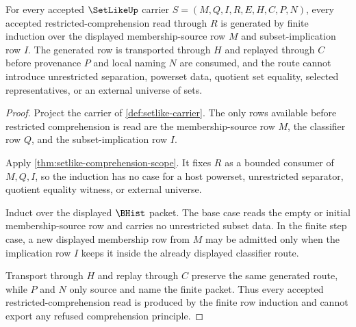 \begin{theorem}
\label{thm:setlike-bounded-comprehension-induction}
For every accepted $\SetLikeUp$ carrier $S=(M,Q,I,R,E,H,C,P,N)$, every accepted restricted-comprehension read through $R$ is generated by finite induction over the displayed membership-source row $M$ and subset-implication row $I$. The generated row is transported through $H$ and replayed through $C$ before provenance $P$ and local naming $N$ are consumed, and the route cannot introduce unrestricted separation, powerset data, quotient set equality, selected representatives, or an external universe of sets.
\end{theorem}
\begin{proof}
Project the carrier of \autoref{def:setlike-carrier}. The only rows available before restricted comprehension is read are the membership-source row $M$, the classifier row $Q$, and the subset-implication row $I$.

Apply \autoref{thm:setlike-comprehension-scope}. It fixes $R$ as a bounded consumer of $M,Q,I$, so the induction has no case for a host powerset, unrestricted separator, quotient equality witness, or external universe.

Induct over the displayed $\BHist$ packet. The base case reads the empty or initial membership-source row and carries no unrestricted subset data. In the finite step case, a new displayed membership row from $M$ may be admitted only when the implication row $I$ keeps it inside the already displayed classifier route.

Transport through $H$ and replay through $C$ preserve the same generated route, while $P$ and $N$ only source and name the finite packet. Thus every accepted restricted-comprehension read is produced by the finite row induction and cannot export any refused comprehension principle.
\end{proof}

